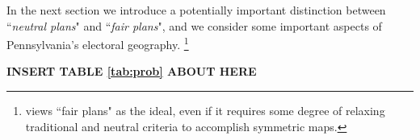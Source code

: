 \par    
    In the next section we introduce a potentially important distinction between ``\textit{neutral plans}" and ``\textit{fair plans}", and we consider some important aspects of Pennsylvania's electoral geography.
    \footnote{\citet{Nagle2019_ELJ} views ``fair plans" as the ideal, even if it requires some degree of relaxing traditional and neutral criteria to accomplish symmetric maps.}
\par
%

\begin{center}\textbf{INSERT TABLE \ref{tab:prob} ABOUT HERE} \end{center}
%
